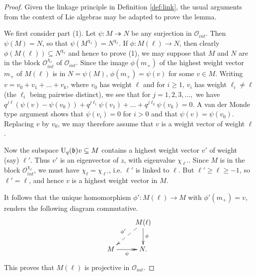 \documentclass[12pt]{amsart}
\theoremstyle{definition}
\theoremstyle{remark}
\numberwithin{equation}{section}
\newcommand{\CO}{{\mathcal O}}
\newcommand{\mf}{\mathfrak}
\newcommand{\fb}{{\mf b}}
\newcommand{\U}{{\rm{U}}}
\begin{document}
\begin{proof}
Given the linkage principle in Definition \ref{def:link}, the usual arguments from the context of Lie algebras may be adapted to prove the lemma. 

We first consider part (1). 
Let $\psi: M\twoheadrightarrow   N$ be any surjection in $\CO_{int}$. Then $\psi(M)= N$, so that $\psi(M^{\chi_\ell})=N^{\chi_\ell}$.  
If $\phi: M(\ell)\longrightarrow N$, then clearly $\phi(M(\ell))\subseteq N^{\chi_\ell}$ and hence to prove (1), we may suppose that $M$ and $N$ are
in the block $\CO_{int}^{\chi_\ell}$ of $\CO_{int}$. 
Since the image $\phi(m_+)$ of the highest weight vector $m_+$ of $M(\ell)$ is in $N=\psi(M)$, 
 $\phi(m_+)=\psi(v)$ for some
$v\in M$. Writing $v=v_0+v_1+\dots+v_k$, where $v_0$ has weight $\ell$ and for $i\geq 1$, $v_i$ has weight $\ell_i\neq \ell$
(the $\ell_i$ being pairwise distinct), we see that for $j=1,2,3,\dots, $ we have 
$q^{j\ell}(\psi(v)-\psi(v_0))+q^{j\ell_1}\psi(v_1)+\dots + q^{j\ell_k}\psi(v_k)=0$. A van der Monde type argument shows that
$\psi(v_i)=0$ for $i>0$ and that $\psi(v)=\psi(v_0)$. Replacing $v$ by $v_0$, we may therefore assume that $v$ is a weight vector 
of weight $\ell$.

Now the subspace $\U_q(\fb) v\subseteq M$ contains a highest weight vector $v'$ of weight (say) $\ell'$. Thus 
$v'$ is an eigenvector of $z$, with eigenvalue $\chi_{\ell'}$. Since $M$
is in the block $\CO_{int}^{\chi_\ell}$, we must have $\chi_\ell=\chi_{\ell'}$, i.e. $\ell'$ is linked to $\ell$. 
But $\ell'\ge \ell\ge -1$,  so $\ell'=\ell$, and hence $v$ is a highest weight vector in $M$. 

It follows that the unique
homomorphism $\phi': M(\ell)\longrightarrow M$ with $\phi'(m_+)=v$,  renders the following diagram commutative. 
\[
\xymatrix{ 
&M(\ell)\ar[d]^\phi\ar@{-->}[ld]_{\phi'}\\
M\ar@{->>}[r]_\psi &N.
}
\]
This proves that $M(\ell)$ is projective in $\CO_{int}$. 


\end{proof}
\end{document}
